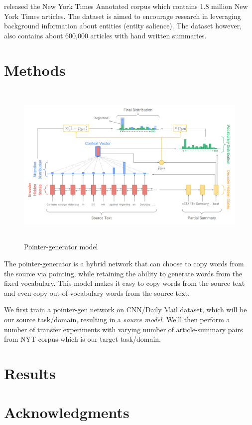 \documentclass[11pt,a4paper]{article}
\begin{document}
\citep{NYT} released the New York Times Annotated corpus which contains 1.8 million New York Times articles. The dataset is aimed to encourage research in leveraging background information about entities (entity salience). The dataset however, also contains about 600,000 articles with hand written summaries.

\section{Methods}

\begin{figure}
  \includegraphics[width=\textwidth,height=8cm]{pointer-gen.png}
  \caption{Pointer-generator model \citep{See2017}}
  \label{fig:pointer-gen}
\end{figure}

The pointer-generator is a hybrid network that can choose to copy words from the source via pointing, while retaining the ability to generate words from the fixed vocabulary. This model makes it easy to copy words from the source text and even copy out-of-vocabulary words from the source text.

We first train a pointer-gen network on CNN/Daily Mail dataset, which will be our source task/domain, resulting in a \textit{source model}. We'll then perform a number of transfer experiments with varying number of article-summary pairs from NYT corpus which is our target task/domain.

\section{Results}

\section*{Acknowledgments}



\end{document}
